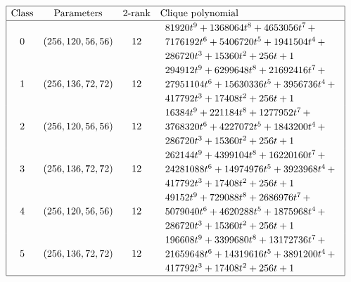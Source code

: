 \documentclass[12pt,a4paper]{article}
\begin{document}
\begin{table}[!bhpt] %
%
\small{}
\begin{align*}
\def\arraystretch{1.2}
\begin{array}{|cccl|}
\hline
\text{Class} &
\text{Parameters} &
\text{2-rank} &
\text{Clique polynomial}
\\
\hline
0 &
(256, 120, 56, 56) &
12 &
\begin{array}{l}
81920t^{9} + 1368064t^{8} + 4653056t^{7}
\,+
\\
 7176192t^{6} + 5406720t^{5} + 1941504t^{4}
\,+
\\
 286720t^{3} + 15360t^{2} + 256t + 1
\end{array}
\\
1 &
(256, 136, 72, 72) &
12 &
\begin{array}{l}
294912t^{9} + 6299648t^{8} + 21692416t^{7}
\,+
\\
 27951104t^{6} + 15630336t^{5} + 3956736t^{4}
\,+
\\
 417792t^{3} + 17408t^{2} + 256t + 1
\end{array}
\\
2 &
(256, 120, 56, 56) &
12 &
\begin{array}{l}
16384t^{9} + 221184t^{8} + 1277952t^{7}
\,+
\\
 3768320t^{6} + 4227072t^{5} + 1843200t^{4}
\,+
\\
 286720t^{3} + 15360t^{2} + 256t + 1
\end{array}
\\
3 &
(256, 136, 72, 72) &
12 &
\begin{array}{l}
262144t^{9} + 4399104t^{8} + 16220160t^{7}
\,+
\\
 24281088t^{6} + 14974976t^{5} + 3923968t^{4}
\,+
\\
 417792t^{3} + 17408t^{2} + 256t + 1
\end{array}
\\
4 &
(256, 120, 56, 56) &
12 &
\begin{array}{l}
49152t^{9} + 729088t^{8} + 2686976t^{7}
\,+
\\
 5079040t^{6} + 4620288t^{5} + 1875968t^{4}
\,+
\\
 286720t^{3} + 15360t^{2} + 256t + 1
\end{array}
\\
5 &
(256, 136, 72, 72) &
12 &
\begin{array}{l}
196608t^{9} + 3399680t^{8} + 13172736t^{7}
\,+
\\
 21659648t^{6} + 14319616t^{5} + 3891200t^{4}
\,+
\\
 417792t^{3} + 17408t^{2} + 256t + 1
\end{array}
\\
\hline
\end{array}
\end{align*}
%
\caption{$[f_{8,3}]$ extended Cayley classes.}
\label{tab-c8_3_EC_classes}
\end{table}
\end{document}
